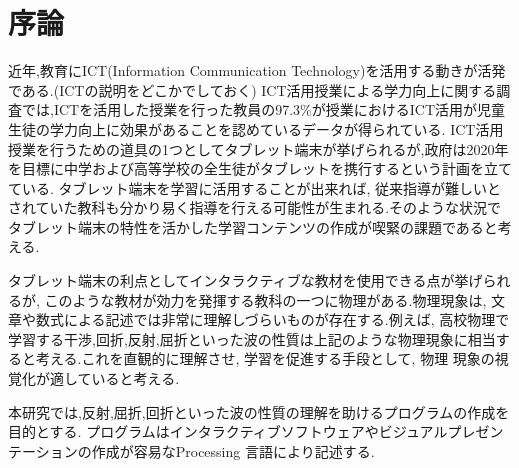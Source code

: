 \chapter{序論}
近年,教育にICT(Information Communication Technology)を活用する動きが活発である.(ICTの説明をどこかでしておく)
ICT活用授業による学力向上に関する調査では,ICTを活用した授業を行った教員の97.3\%が授業におけるICT活用が児童生徒の学力向上に効果があることを認めているデータが得られている\cite{simizu}.
ICT活用授業を行うための道具の1つとしてタブレット端末が挙げられるが,政府は2020年を目標に中学および高等学校の全生徒がタブレットを携行するという計画を立てている\cite{monbu}. タブレット端末を学習に活用することが出来れば, 従来指導が難しいとされていた教科も分かり易く指導を行える可能性が生まれる.そのような状況でタブレット端末の特性を活かした学習コンテンツの作成が喫緊の課題であると考える.

タブレット端末の利点としてインタラクティブな教材を使用できる点が挙げられるが, このような教材が効力を発揮する教科の一つに物理がある.物理現象は, 文章や数式による記述では非常に理解しづらいものが存在する.例えば, 高校物理で学習する干渉,回折,反射,屈折といった波の性質は上記のような物理現象に相当すると考える.これを直観的に理解させ, 学習を促進する手段として, 物理 現象の視覚化が適していると考える. 

本研究では,反射,屈折,回折といった波の性質の理解を助けるプログラムの作成を目的とする.
プログラムはインタラクティブソフトウェアやビジュアルプレゼンテーションの作成が容易なProcessing 言語により記述する.